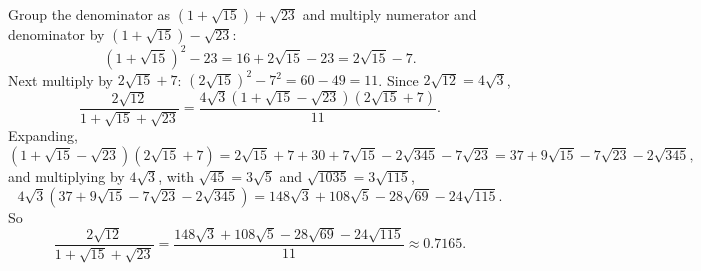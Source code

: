 Group the denominator as $\left(1+\sqrt{15}\right)+\sqrt{23}$ and multiply numerator and denominator by $\left(1+\sqrt{15}\right)-\sqrt{23}$:
\[\left(1+\sqrt{15}\right)^2-23=16+2\sqrt{15}-23=2\sqrt{15}-7 .\]
Next multiply by $2\sqrt{15}+7$: $\left(2\sqrt{15}\right)^2-7^2=60-49=11$. Since $2\sqrt{12}=4\sqrt3$,
\[\dfrac{2\sqrt{12}}{1+\sqrt{15}+\sqrt{23}}=\dfrac{4\sqrt3\left(1+\sqrt{15}-\sqrt{23}\right)\left(2\sqrt{15}+7\right)}{11}.\]
Expanding,
\[\left(1+\sqrt{15}-\sqrt{23}\right)\left(2\sqrt{15}+7\right)=2\sqrt{15}+7+30+7\sqrt{15}-2\sqrt{345}-7\sqrt{23}=37+9\sqrt{15}-7\sqrt{23}-2\sqrt{345},\]
and multiplying by $4\sqrt3$, with $\sqrt{45}=3\sqrt5$ and $\sqrt{1035}=3\sqrt{115}$,
\[4\sqrt3\left(37+9\sqrt{15}-7\sqrt{23}-2\sqrt{345}\right)=148\sqrt3+108\sqrt5-28\sqrt{69}-24\sqrt{115}.\]
So
\[\dfrac{2\sqrt{12}}{1+\sqrt{15}+\sqrt{23}}=\boxed{\dfrac{148\sqrt3+108\sqrt5-28\sqrt{69}-24\sqrt{115}}{11}}\approx0.7165 .\]
